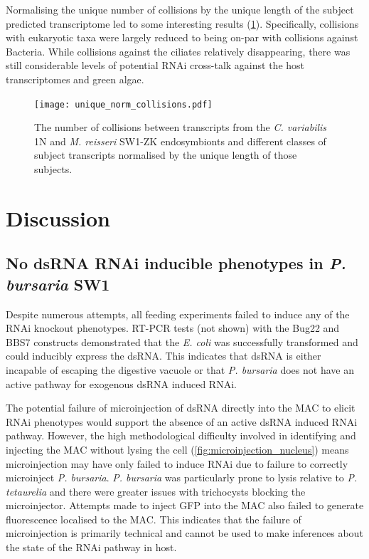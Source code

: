 Normalising the unique number of collisions by the unique length of
the subject predicted transcriptome led to some interesting results (\cref{fig:edicer_unique_norm}).
Specifically, collisions with eukaryotic taxa were largely reduced to being on-par
with collisions against Bacteria.
While collisions against the ciliates relatively disappearing,
there was still considerable levels of potential RNAi cross-talk against
the host transcriptomes and green algae.

\begin{figure}
    \centering
    \texttt{[image: unique\_norm\_collisions.pdf]}
    \caption[Normalised unique eDicer collisions]{The number of collisions
        between transcripts from the \textit{C. variabilis} 1N
    and \textit{M. reisseri} SW1-ZK endosymbionts and different
classes of subject transcripts normalised by the unique length of those
subjects.}
    \label{fig:edicer_unique_norm}
\end{figure}

\section{Discussion}

\subsection{No dsRNA RNAi inducible phenotypes in \textit{P. bursaria} SW1}

Despite numerous attempts, all feeding experiments failed to induce
any of the RNAi knockout phenotypes.  RT-PCR tests (not shown) with the Bug22
and BBS7 constructs demonstrated
that the \textit{E. coli} was successfully transformed and could 
inducibly express the dsRNA.  
This indicates that dsRNA is either incapable of escaping the digestive vacuole
or that \textit{P. bursaria} does not have an active pathway for exogenous dsRNA 
induced RNAi.

The potential failure of microinjection of dsRNA directly into the MAC
to elicit RNAi phenotypes would support the absence
of an active dsRNA induced RNAi pathway. 
However, the high methodological difficulty involved in identifying and injecting
the MAC without lysing the cell (\cref{fig:microinjection_nucleus}) 
means microinjection may have only failed to induce RNAi due to failure
to correctly microinject \textit{P. bursaria}.   \textit{P. bursaria}
was particularly prone to lysis relative to \textit{P. tetaurelia} and
there were greater issues with trichocysts blocking the microinjector. 
Attempts made to inject GFP into the MAC also failed to generate fluorescence
localised to the MAC.  This indicates that the failure of microinjection is
primarily technical and cannot be used to make inferences about the state
of the RNAi pathway in host. 

